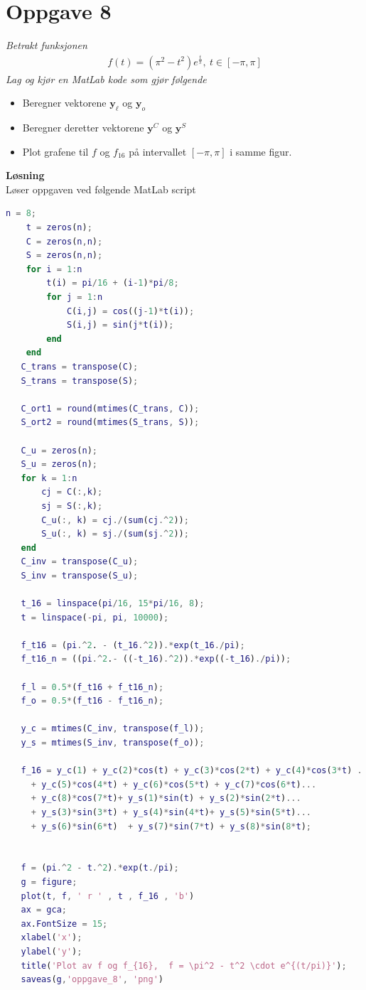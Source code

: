 \documentclass[12pt,
               a4paper,
               article,
               oneside,
               oldfontcommands,
               norsk]{memoir}
\begin{document}
\section*{Oppgave 8}
\emph{Betrakt funksjonen}
\begin{align*}
f(t) = (\pi^2 - t^2) e^{\frac{t}{\pi}}, \ t \in [-\pi, \pi]
\end{align*}
\emph{Lag og kjør en MatLab kode som gjør følgende}
\begin{itemize}
\item Beregner vektorene $\boldsymbol{y}_\ell$ og $\boldsymbol{y}_o$
\item Beregner deretter vektorene $\boldsymbol{y}^{C}$ og $\boldsymbol{y}^{S}$ 
\item Plot grafene til $f$ og $f_{16}$ på intervallet $[-\pi, \pi]$ i samme figur.
\end{itemize}
\textbf{Løsning}\vspace{3mm}\\
Løser oppgaven ved følgende MatLab script
\begin{lstlisting}[language=MATLAB]
    n = 8;
    t = zeros(n);
    C = zeros(n,n);
    S = zeros(n,n);
    for i = 1:n
        t(i) = pi/16 + (i-1)*pi/8;
        for j = 1:n
            C(i,j) = cos((j-1)*t(i));
            S(i,j) = sin(j*t(i));
        end
    end
   C_trans = transpose(C);
   S_trans = transpose(S);
   
   C_ort1 = round(mtimes(C_trans, C));
   S_ort2 = round(mtimes(S_trans, S));  
   
   C_u = zeros(n);
   S_u = zeros(n);
   for k = 1:n
       cj = C(:,k);
       sj = S(:,k);
       C_u(:, k) = cj./(sum(cj.^2));
       S_u(:, k) = sj./(sum(sj.^2));
   end
   C_inv = transpose(C_u);
   S_inv = transpose(S_u);
   
   t_16 = linspace(pi/16, 15*pi/16, 8);
   t = linspace(-pi, pi, 10000);
   
   f_t16 = (pi.^2. - (t_16.^2)).*exp(t_16./pi);
   f_t16_n = ((pi.^2.- ((-t_16).^2)).*exp((-t_16)./pi));
   
   f_l = 0.5*(f_t16 + f_t16_n);
   f_o = 0.5*(f_t16 - f_t16_n);
   
   y_c = mtimes(C_inv, transpose(f_l));
   y_s = mtimes(S_inv, transpose(f_o));
   
   f_16 = y_c(1) + y_c(2)*cos(t) + y_c(3)*cos(2*t) + y_c(4)*cos(3*t) ...
     + y_c(5)*cos(4*t) + y_c(6)*cos(5*t) + y_c(7)*cos(6*t)... 
     + y_c(8)*cos(7*t)+ y_s(1)*sin(t) + y_s(2)*sin(2*t)... 
     + y_s(3)*sin(3*t) + y_s(4)*sin(4*t)+ y_s(5)*sin(5*t)...  
     + y_s(6)*sin(6*t)  + y_s(7)*sin(7*t) + y_s(8)*sin(8*t);
     
     
   f = (pi.^2 - t.^2).*exp(t./pi);
   g = figure;
   plot(t, f, ' r ' , t , f_16 , 'b')
   ax = gca;
   ax.FontSize = 15;
   xlabel('x');
   ylabel('y');
   title('Plot av f og f_{16},  f = \pi^2 - t^2 \cdot e^{(t/pi)}');
   saveas(g,'oppgave_8', 'png')
\end{lstlisting}
\end{document}
